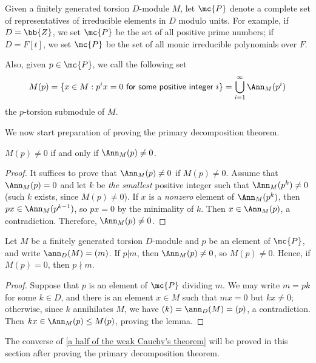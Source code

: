 \begin{nota}
    Given a finitely generated torsion $D$-module $M$, let $\mc{P}$ denote a complete set of representatives of irreducible elements in $D$ modulo units.
    For example, if $D=\bb{Z}$, we set $\mc{P}$ be the set of all positive prime numbers; if $D=F[t]$, we set $\mc{P}$ be the set of all monic irreducible polynomials over $F$.

    Also, given $p\in\mc{P}$, we call the following set
    \begin{align*}
        M(p)=\{x\in M: p^i x=0\textsf{ for some positive integer }i\}=\bigcup_{i=1}^\infty \Ann_M(p^i)
    \end{align*}
    the $p$-torsion \color{brown}submodule \color{black} of $M$.
\end{nota}

We now start preparation of proving the primary decomposition theorem.
\begin{prop}\label{the smallest annihilated submodule deterimines if the p-torsion submodule is nonzero}
    $M(p)\neq 0$ if and only if $\Ann_M(p)\neq 0$.
\end{prop}
\begin{proof}
    It suffices to prove that $\Ann_M(p)\neq 0$ if $M(p)\neq 0$.
    Assume that $\Ann_M(p)=0$ and let $k$ be \textit{the smallest} positive integer such that $\Ann_M(p^k)\neq 0$ (such $k$ exists, since $M(p)\neq 0$).
    If $x$ is a \textit{nonzero} element of $\Ann_M(p^k)$, then $px\in\Ann_M(p^{k-1})$, so $px=0$ by the minimality of $k$.
    Then $x\in\Ann_M(p)$, a contradiction.
    Therefore, $\Ann_M(p)\neq 0$.
\end{proof}
\begin{prop}\label{a half of the weak Cauchy's theorem}
    Let $M$ be a finitely generated torsion $D$-module and $p$ be an element of $\mc{P}$, and write $\ann_D(M)=(m)$.
    If $p|m$, then $\Ann_M(p)\neq 0$, so $M(p)\neq 0$.
    Hence, if $M(p)=0$, then $p\nmid m$.
\end{prop}
\begin{proof}
    Suppose that $p$ is an element of $\mc{P}$ dividing $m$.
    We may write $m=pk$ for some $k\in D$, and there is an element $x\in M$ such that $mx=0$ but $kx\neq 0$; otherwise, since $k$ annihilates $M$, we have $(k)=\ann_D(M)=(p)$, a contradiction.
    Then $kx\in\Ann_M(p)\leq M(p)$, proving the lemma.
\end{proof}
\begin{rmk}
    The converse of \cref{a half of the weak Cauchy's theorem} will be proved in this section after proving the primary decomposition theorem.
\end{rmk}

